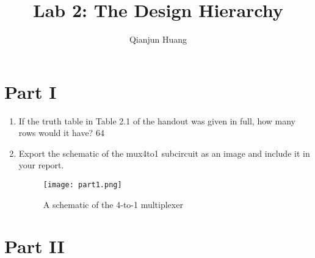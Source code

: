 \documentclass{article}
\title{Lab 2: The Design Hierarchy}
\author{Qianjun Huang}
\begin{document}
\maketitle

\section*{Part I}

\begin{enumerate}
\item If the truth table in Table 2.1 of the handout was given in full, how many rows would it have?
64

\item Export the schematic of the mux4to1 subcircuit as an image and include it in your report.

\begin{figure}[ht!]
    \centering
    \texttt{[image: part1.png]}
    \caption{A schematic of the 4-to-1 multiplexer}
    \label{f:part1}
\end{figure}
\end{enumerate}

\section*{Part II}
\end{document}
